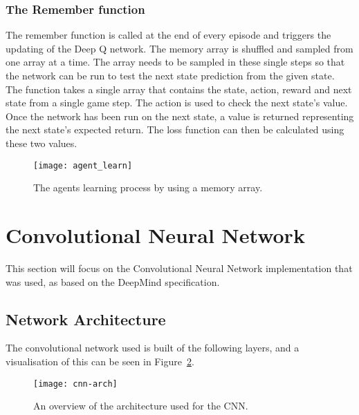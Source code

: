 \subsubsection{The Remember function}

The remember function is called at the end of every episode and triggers the
updating of the Deep Q network. The memory array is shuffled and sampled from one
array at a time. The array needs to be sampled in these single steps so that the
network can be run to test the next state prediction from the given state. The
function takes a single array that contains the state, action, reward and next
state from a single game step. The action is used to check the next state's
value. Once the network has been run on the next state, a value is returned
representing the next state's expected return. The loss function can then be
calculated using these two values.

\begin{figure}[h]
    \centering
    \texttt{[image: agent\_learn]}
    \caption{The agents learning process by using a memory array.}%
    \label{fig:agent_learn}
\end{figure}

\section{Convolutional Neural Network}

This section will focus on the Convolutional Neural Network implementation that
was used, as based on the DeepMind specification.

\subsection{Network Architecture}

The convolutional network used is built of the following layers, and a
visualisation of this can be seen in Figure~\ref{fig:cnn_arch}.

\begin{figure}[h]
    \centering
    \texttt{[image: cnn-arch]}
    \caption{An overview of the architecture used for the CNN.}%
    \label{fig:cnn_arch}
\end{figure}

